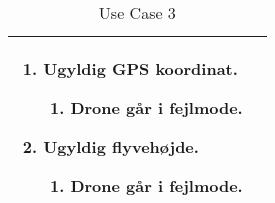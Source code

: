 \begin{table}[H]
\begin{tabular}{| p{3cm}| p{11.5cm}|}
									\renewcommand{\labelenumi}{\Roman{enumi}:}
									\renewcommand{\labelenumii}{\alph{enumii})}
									\begin{enumerate}[topsep=0.0cm,leftmargin=0.5cm]
										\item Ugyldig GPS koordinat.
											\begin{enumerate}[topsep=0cm, leftmargin=1cm]
												\item Drone går i fejlmode.
											\end{enumerate}
										\item Ugyldig flyvehøjde.
											\begin{enumerate}[topsep=0cm, leftmargin=1cm]
												\item Drone går i fejlmode.
											\end{enumerate}
									\end{enumerate} \\\hline	

\end{tabular}
\caption{Use Case 3}
\label{tab:UC3}
\end{table}
